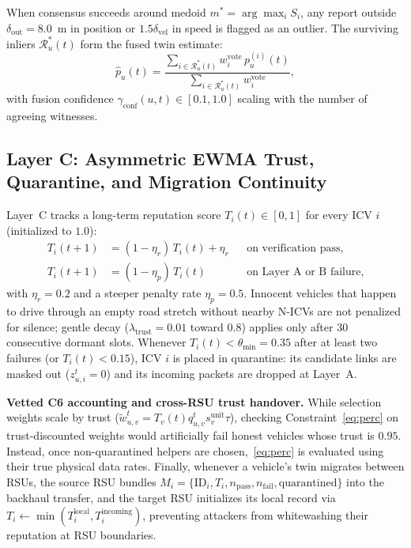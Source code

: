 \documentclass[conference]{IEEEtran}
\begin{document}
When consensus succeeds around medoid $m^* = \arg\max_i S_i$, any report outside $\delta_{\mathrm{out}}=8.0$~m in position or $1.5\delta_{\mathrm{vel}}$ in speed is flagged as an outlier. The surviving inliers $\mathcal{R}^*_u(t)$ form the fused twin estimate:
\begin{equation}
\hat{p}_u(t)=\frac{\sum_{i\in\mathcal{R}^*_u(t)} w^{\mathrm{vote}}_i\,p^{(i)}_u(t)}{\sum_{i\in\mathcal{R}^*_u(t)} w^{\mathrm{vote}}_i},
\label{eq:fuse}
\end{equation}
with fusion confidence $\gamma_{\mathrm{conf}}(u,t)\in[0.1, 1.0]$ scaling with the number of agreeing witnesses.

\subsection{Layer C: Asymmetric EWMA Trust, Quarantine, and Migration Continuity}
Layer~C tracks a long-term reputation score $T_i(t)\in[0,1]$ for every ICV $i$ (initialized to $1.0$):
\begin{align}
T_i(t+1) &= (1-\eta_r)\,T_i(t)+\eta_r && \text{on verification pass,} \label{eq:rew}\\
T_i(t+1) &= (1-\eta_p)\,T_i(t) && \text{on Layer A or B failure,} \label{eq:pen}
\end{align}
with $\eta_r=0.2$ and a steeper penalty rate $\eta_p=0.5$. Innocent vehicles that happen to drive through an empty road stretch without nearby N-ICVs are not penalized for silence; gentle decay ($\lambda_{\mathrm{trust}}=0.01$ toward $0.8$) applies only after $30$ consecutive dormant slots. Whenever $T_i(t) < \theta_{\min}=0.35$ after at least two failures (or $T_i(t) < 0.15$), ICV $i$ is placed in quarantine: its candidate links are masked out ($z^t_{u,i}=0$) and its incoming packets are dropped at Layer~A.

\textbf{Vetted C6 accounting and cross-RSU trust handover.} While selection weights scale by trust ($\tilde{w}^t_{u,v} = T_v(t) q^t_{u,v} s^{\mathrm{unit}}_v \tau$), checking Constraint~\eqref{eq:perc} on trust-discounted weights would artificially fail honest vehicles whose trust is $0.95$. Instead, once non-quarantined helpers are chosen,~\eqref{eq:perc} is evaluated using their true physical data rates. Finally, whenever a vehicle's twin migrates between RSUs, the source RSU bundles $M_i = \{\mathrm{ID}_i, T_i, n_{\mathrm{pass}}, n_{\mathrm{fail}}, \text{quarantined}\}$ into the backhaul transfer, and the target RSU initializes its local record via $T_i \leftarrow \min(T^{\mathrm{local}}_i, T^{\mathrm{incoming}}_i)$, preventing attackers from whitewashing their reputation at RSU boundaries.
\end{document}
